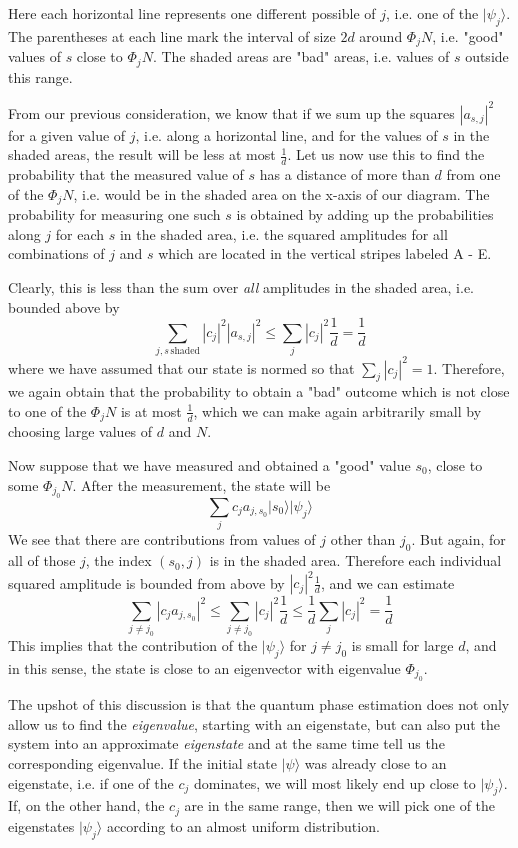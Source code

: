 \documentclass[a4paper, draft]{article}
\theoremstyle{own}
\theoremstyle{remark}
\begin{document}
Here each horizontal line represents one different possible of $j$, i.e. one of the $|\psi_j \rangle$. The parentheses at each line mark the interval of size $2d$ around $\Phi_j N$, i.e. "good" values of $s$ close to $\Phi_j N$. The shaded areas are "bad" areas, i.e. values of $s$ outside this range.  

From our previous consideration, we know that if we sum up the squares $|a_{s,j}|^2$ for a given value of $j$, i.e. along a horizontal line, and for the values of $s$ in the shaded areas, the result will be less at most $\frac{1}{d}$. Let us now use this to find the probability that the measured value of $s$ has a distance of more than $d$ from one of the $\Phi_j N$, i.e. would be in the shaded area on the x-axis of our diagram. The probability for measuring one such $s$ is obtained by adding up the probabilities along $j$ for each $s$ in the shaded area, i.e. the squared amplitudes for all combinations of $j$ and $s$ which are located in the vertical stripes labeled A - E.

Clearly, this is less than the sum over \emph{all} amplitudes in the shaded area, i.e. bounded above by
$$
\sum_{j, s \, \text{shaded}} |c_j|^2  |a_{s,j}|^2 \leq \sum_j |c_j|^2 \frac{1}{d} = \frac{1}{d}
$$
where we have assumed that our state is normed so that $\sum_j |c_j|^2 = 1$. Therefore, we again obtain that the probability to obtain a "bad" outcome which is not close to one of the $\Phi_j N$ is at most $\frac{1}{d}$, which we can make again arbitrarily small by choosing large values of $d$ and $N$.

Now suppose that we have measured and obtained a "good" value $s_0$, close to some $\Phi_{j_0} N$. After the measurement, the state will be
$$
\sum_j  
c_j a_{j,s_0} |s_0 \rangle |\psi_j \rangle
$$
We see that there are contributions from values of $j$ other than $j_0$. But again, for all of those $j$, the index $(s_0, j)$ is in the shaded area. Therefore each individual squared amplitude is bounded from above by $|c_j|^2 \frac{1}{d}$, and we can estimate
$$
\sum_{j \neq j_0} |c_j a_{j,s_0}|^2 \leq \sum_{j \neq j_0} |c_j|^2 \frac{1}{d} \leq \frac{1}{d} \sum_j |c_j|^2 = \frac{1}{d}
$$
This implies that the contribution of the $|\psi_j \rangle$ for $j \neq j_0$ is small for large $d$, and in this sense, the state is close to an eigenvector with eigenvalue $\Phi_{j_0}$. 

The upshot of this discussion is that the quantum phase estimation does not only allow us to find the \emph{eigenvalue}, starting with an eigenstate, but can also put the system into an approximate \emph{eigenstate} and at the same time tell us the corresponding eigenvalue. If the initial state $|\psi \rangle$ was already close to an eigenstate, i.e. if one of the $c_j$ dominates, we will most likely end up close to $|\psi_j \rangle$. If, on the other hand, the $c_j$ are in the same range, then we will pick one of the eigenstates $|\psi_j \rangle$ according to an almost uniform distribution. 
\end{document}
